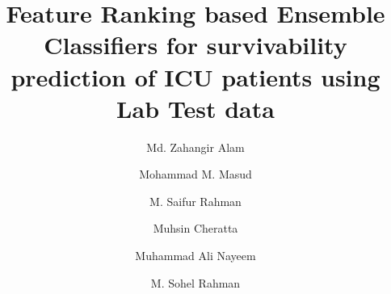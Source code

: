\documentclass[3p,times]{elsarticle} %
\begin{document}
	
	\begin{frontmatter}
		
		
		
		
		\title{Feature Ranking based Ensemble Classifiers for survivability prediction of ICU patients using Lab Test data}
		
		
		\author[buetaddress]{Md. Zahangir Alam}
		
		\author[uaeuaddress]{Mohammad M. Masud }
        
        \author[buetaddress]{M. Saifur Rahman}
		
		\author[uaeuaddress]{Muhsin Cheratta}
		
		\author[buetaddress]{Muhammad Ali Nayeem}			
					
		\author[buetaddress]{M. Sohel Rahman}
		
		

\end{frontmatter}
\end{document}
